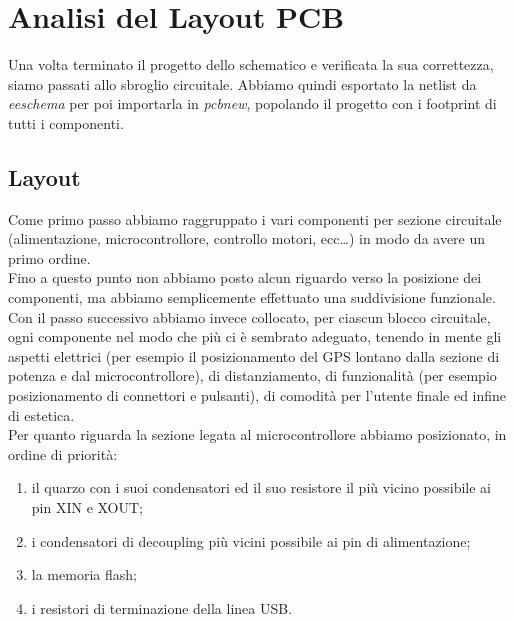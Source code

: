 \chapter{Analisi del Layout PCB}

Una volta terminato il progetto dello schematico e verificata la sua
correttezza, siamo passati allo sbroglio circuitale. Abbiamo quindi
esportato la netlist da \emph{eeschema} per poi importarla in
\emph{pcbnew}, popolando il progetto con i footprint di tutti i
componenti.

\hypertarget{layout}{%
\section{Layout}\label{layout}}

Come primo passo abbiamo raggruppato i vari componenti per sezione
circuitale (alimentazione, microcontrollore, controllo motori,
ecc\ldots) in modo da avere un primo ordine.\\
Fino a questo punto non abbiamo posto alcun riguardo verso la posizione
dei componenti, ma abbiamo semplicemente effettuato una suddivisione
funzionale. Con il passo successivo abbiamo invece collocato, per
ciascun blocco circuitale, ogni componente nel modo che più ci è
sembrato adeguato, tenendo in mente gli aspetti elettrici (per esempio
il posizionamento del GPS lontano dalla sezione di potenza e dal
microcontrollore), di distanziamento, di funzionalità (per esempio
posizionamento di connettori e pulsanti), di comodità per l'utente
finale ed infine di estetica.\\
Per quanto riguarda la sezione legata al microcontrollore abbiamo
posizionato, in ordine di priorità:

\begin{enumerate}
\def\labelenumi{\arabic{enumi}.}
\item
  
  il quarzo con i suoi condensatori ed il suo resistore il più vicino
  possibile ai pin XIN e XOUT;
  
\item
  
  i condensatori di decoupling più vicini possibile ai pin di
  alimentazione;
  
\item
  
  la memoria flash;
  
\item
  
  i resistori di terminazione della linea USB.
  
\end{enumerate}

